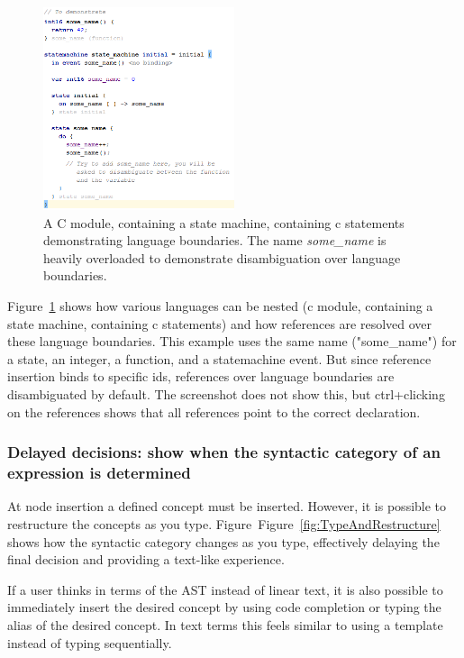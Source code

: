 \documentclass[preprint,numbers,10pt]{sigplanconf}
\begin{document}
\begin{figure}[H]
	\centering
	\includegraphics[width=0.5\textwidth]{screens/LanguageDemarcationAndAmbiguity.png}
	\caption{A C module, containing a state machine, containing c statements demonstrating language boundaries. The name \emph{some\_name} is heavily overloaded to demonstrate disambiguation over language boundaries.}
	\label{fig:LanguageDemarcationAndAmbiguity}
\end{figure}

Figure~\ref{fig:LanguageDemarcationAndAmbiguity} shows how various languages can be nested (c module, containing a state machine, containing c statements) and how references are resolved over these language boundaries. This example uses the same name ("some\_name") for a state, an integer, a function, and a statemachine event. But since reference insertion binds to specific ids, references over language boundaries are disambiguated by default. The screenshot does not show this, but ctrl+clicking on the references shows that all references point to the correct declaration.

\subsubsection{Delayed decisions: show when the syntactic category of an expression is determined}
At node insertion a defined concept must be inserted. However, it is possible to restructure the concepts as you type. Figure~Figure~\ref{fig:TypeAndRestructure} shows how the syntactic category changes as you type, effectively delaying the final decision and providing a text-like experience.

If a user thinks in terms of the AST instead of linear text, it is also possible to immediately insert the desired concept by using code completion or typing the alias of the desired concept. In text terms this feels similar to using a template instead of typing sequentially.
\end{document}

